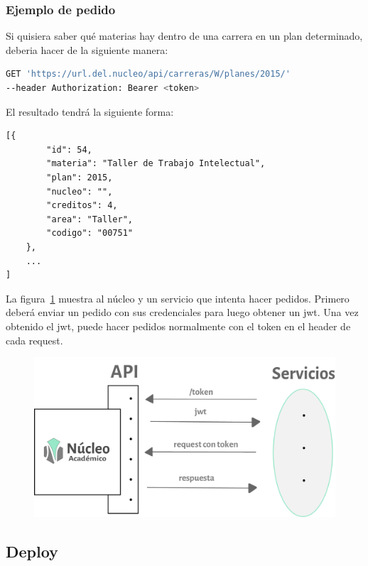 \subsubsection{Ejemplo de pedido}
Si quisiera saber qué materias hay dentro de una carrera en un plan determinado, deberia hacer de la siguiente manera:

\begin{lstlisting}[language=bash]
GET 'https://url.del.nucleo/api/carreras/W/planes/2015/'
--header Authorization: Bearer <token>
\end{lstlisting}

El resultado tendrá la siguiente forma:

\begin{verbatim}
[{
        "id": 54,
        "materia": "Taller de Trabajo Intelectual",
        "plan": 2015,
        "nucleo": "",
        "creditos": 4,
        "area": "Taller",
        "codigo": "00751"
    },
    ...
]
\end{verbatim}

La figura~\ref{fig:nucleo-jwt} muestra al núcleo y un servicio que intenta hacer pedidos. Primero deberá enviar un pedido con sus credenciales para luego obtener un jwt. 
Una vez obtenido el jwt, puede hacer pedidos normalmente con el token en el header de cada request.

\begin{figure}[H]
  \centering
    \includegraphics[scale=0.8]{images/nucleo/jwt.png}
  \label{fig:nucleo-jwt}
\end{figure}


\subsection{Deploy}

